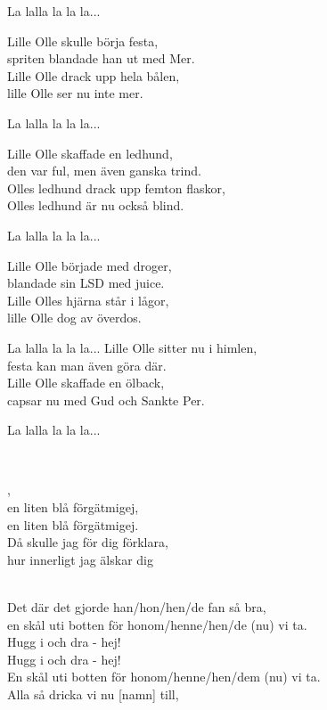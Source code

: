 La lalla la la la...

Lille Olle skulle börja festa,\\
spriten blandade han ut med Mer.\\
Lille Olle drack upp hela bålen,\\
lille Olle ser nu inte mer.

La lalla la la la...

Lille Olle skaffade en ledhund,\\
den var ful, men även ganska trind.\\
Olles ledhund drack upp femton flaskor,\\
Olles ledhund är nu också blind.

La lalla la la la...

Lille Olle började med droger,\\
blandade sin LSD med juice.\\
Lille Olles hjärna står i lågor,\\
lille Olle dog av överdos.

La lalla la la la...
\newpage
Lille Olle sitter nu i himlen,\\
festa kan man även göra där.\\
Lille Olle skaffade en ölback,\\
capsar nu med Gud och Sankte Per.

La lalla la la la...

 \\

\melochtext{}

,\\
en liten blå förgätmigej, \\
en liten blå förgätmigej. \\
Då skulle jag för dig förklara, \\
hur innerligt jag älskar dig


\newpage 

\melochtext{}\\

\songtext{}Det där det gjorde han/hon/hen/de fan så bra,\\
en skål uti botten för honom/henne/hen/de (nu) vi ta.\\
Hugg i och dra - hej!\\
Hugg i och dra - hej!\\
En skål uti botten för honom/henne/hen/dem (nu) vi ta.\\
Alla så dricka vi nu [namn] till,

